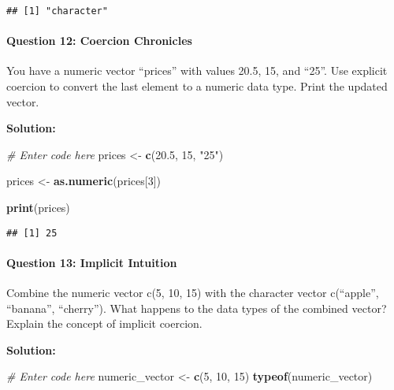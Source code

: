 \documentclass[
]{article}
\newenvironment{Shaded}{\begin{snugshade}}{\end{snugshade}}
\newcommand{\CommentTok}[1]{\textcolor[rgb]{0.56,0.35,0.01}{\textit{#1}}}
\newcommand{\DecValTok}[1]{\textcolor[rgb]{0.00,0.00,0.81}{#1}}
\newcommand{\FloatTok}[1]{\textcolor[rgb]{0.00,0.00,0.81}{#1}}
\newcommand{\FunctionTok}[1]{\textcolor[rgb]{0.13,0.29,0.53}{\textbf{#1}}}
\newcommand{\NormalTok}[1]{#1}
\newcommand{\OtherTok}[1]{\textcolor[rgb]{0.56,0.35,0.01}{#1}}
\newcommand{\StringTok}[1]{\textcolor[rgb]{0.31,0.60,0.02}{#1}}
\begin{document}
\begin{verbatim}
## [1] "character"
\end{verbatim}

\hypertarget{question-12-coercion-chronicles}{%
\paragraph{Question 12: Coercion
Chronicles}\label{question-12-coercion-chronicles}}

You have a numeric vector ``prices'' with values 20.5, 15, and ``25''.
Use explicit coercion to convert the last element to a numeric data
type. Print the updated vector.

\textbf{Solution:}

\begin{Shaded}
\begin{Highlighting}[]
\CommentTok{\# Enter code here}
\NormalTok{prices }\OtherTok{\textless{}{-}} \FunctionTok{c}\NormalTok{(}\FloatTok{20.5}\NormalTok{, }\DecValTok{15}\NormalTok{, }\StringTok{"25"}\NormalTok{)}

\NormalTok{prices }\OtherTok{\textless{}{-}} \FunctionTok{as.numeric}\NormalTok{(prices[}\DecValTok{3}\NormalTok{])}

\FunctionTok{print}\NormalTok{(prices)}
\end{Highlighting}
\end{Shaded}

\begin{verbatim}
## [1] 25
\end{verbatim}

\hypertarget{question-13-implicit-intuition}{%
\paragraph{Question 13: Implicit
Intuition}\label{question-13-implicit-intuition}}

Combine the numeric vector c(5, 10, 15) with the character vector
c(``apple'', ``banana'', ``cherry''). What happens to the data types of
the combined vector? Explain the concept of implicit coercion.

\textbf{Solution:}

\begin{Shaded}
\begin{Highlighting}[]
\CommentTok{\# Enter code here}
\NormalTok{numeric\_vector }\OtherTok{\textless{}{-}} \FunctionTok{c}\NormalTok{(}\DecValTok{5}\NormalTok{, }\DecValTok{10}\NormalTok{, }\DecValTok{15}\NormalTok{)}
\FunctionTok{typeof}\NormalTok{(numeric\_vector)}
\end{Highlighting}
\end{Shaded}
\end{document}
